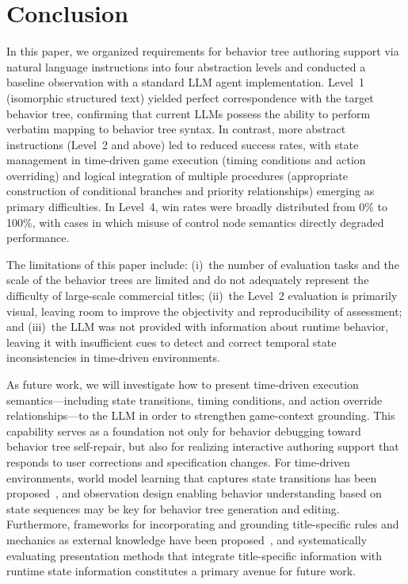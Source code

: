 \documentclass[conference]{IEEEtran}
\begin{document}
\section{Conclusion}

In this paper, we organized requirements for behavior tree authoring support via natural language instructions into four abstraction levels and conducted a baseline observation with a standard LLM agent implementation. Level~1 (isomorphic structured text) yielded perfect correspondence with the target behavior tree, confirming that current LLMs possess the ability to perform verbatim mapping to behavior tree syntax. In contrast, more abstract instructions (Level~2 and above) led to reduced success rates, with state management in time-driven game execution (timing conditions and action overriding) and logical integration of multiple procedures (appropriate construction of conditional branches and priority relationships) emerging as primary difficulties. In Level~4, win rates were broadly distributed from 0\% to 100\%, with cases in which misuse of control node semantics directly degraded performance.

The limitations of this paper include: (i)~the number of evaluation tasks and the scale of the behavior trees are limited and do not adequately represent the difficulty of large-scale commercial titles; (ii)~the Level~2 evaluation is primarily visual, leaving room to improve the objectivity and reproducibility of assessment; and (iii)~the LLM was not provided with information about runtime behavior, leaving it with insufficient cues to detect and correct temporal state inconsistencies in time-driven environments.

As future work, we will investigate how to present time-driven execution semantics---including state transitions, timing conditions, and action override relationships---to the LLM in order to strengthen game-context grounding. This capability serves as a foundation not only for behavior debugging toward behavior tree self-repair, but also for realizing interactive authoring support that responds to user corrections and specification changes. For time-driven environments, world model learning that captures state transitions has been proposed~\cite{ha2018world}, and observation design enabling behavior understanding based on state sequences may be key for behavior tree generation and editing. Furthermore, frameworks for incorporating and grounding title-specific rules and mechanics as external knowledge have been proposed~\cite{fan2022minedojo}, and systematically evaluating presentation methods that integrate title-specific information with runtime state information constitutes a primary avenue for future work.



\end{document}
